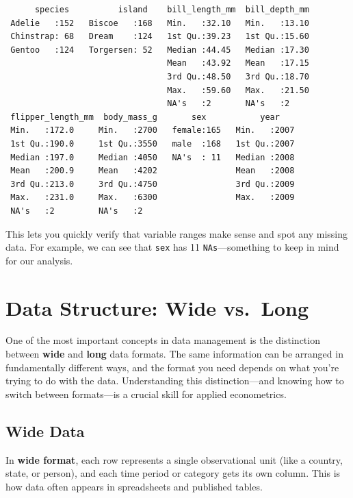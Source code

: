 \documentclass[
  letterpaper,
  DIV=11,
  numbers=noendperiod]{scrreprt}
\begin{document}
\begin{verbatim}
      species          island    bill_length_mm  bill_depth_mm  
 Adelie   :152   Biscoe   :168   Min.   :32.10   Min.   :13.10  
 Chinstrap: 68   Dream    :124   1st Qu.:39.23   1st Qu.:15.60  
 Gentoo   :124   Torgersen: 52   Median :44.45   Median :17.30  
                                 Mean   :43.92   Mean   :17.15  
                                 3rd Qu.:48.50   3rd Qu.:18.70  
                                 Max.   :59.60   Max.   :21.50  
                                 NA's   :2       NA's   :2      
 flipper_length_mm  body_mass_g       sex           year     
 Min.   :172.0     Min.   :2700   female:165   Min.   :2007  
 1st Qu.:190.0     1st Qu.:3550   male  :168   1st Qu.:2007  
 Median :197.0     Median :4050   NA's  : 11   Median :2008  
 Mean   :200.9     Mean   :4202                Mean   :2008  
 3rd Qu.:213.0     3rd Qu.:4750                3rd Qu.:2009  
 Max.   :231.0     Max.   :6300                Max.   :2009  
 NA's   :2         NA's   :2                                 
\end{verbatim}

This lets you quickly verify that variable ranges make sense and spot
any missing data. For example, we can see that \texttt{sex} has 11
\texttt{NA\textquotesingle{}s}---something to keep in mind for our
analysis.

\section{Data Structure: Wide
vs.~Long}\label{data-structure-wide-vs.-long}

One of the most important concepts in data management is the distinction
between \textbf{wide} and \textbf{long} data formats. The same
information can be arranged in fundamentally different ways, and the
format you need depends on what you're trying to do with the data.
Understanding this distinction---and knowing how to switch between
formats---is a crucial skill for applied econometrics.

\subsection{Wide Data}\label{wide-data}

In \textbf{wide format}, each row represents a single observational unit
(like a country, state, or person), and each time period or category
gets its own column. This is how data often appears in spreadsheets and
published tables.
\end{document}
